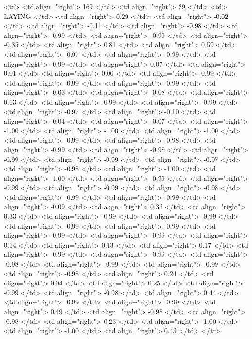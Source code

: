  <tr> <td align="right"> 169 </td> <td align="right">  29 </td> <td> LAYING </td> <td align="right"> 0.29 </td> <td align="right"> -0.02 </td> <td align="right"> -0.11 </td> <td align="right"> -0.98 </td> <td align="right"> -0.99 </td> <td align="right"> -0.99 </td> <td align="right"> -0.35 </td> <td align="right"> 0.81 </td> <td align="right"> 0.59 </td> <td align="right"> -0.97 </td> <td align="right"> -0.99 </td> <td align="right"> -0.99 </td> <td align="right"> 0.07 </td> <td align="right"> 0.01 </td> <td align="right"> 0.00 </td> <td align="right"> -0.99 </td> <td align="right"> -0.99 </td> <td align="right"> -0.99 </td> <td align="right"> -0.03 </td> <td align="right"> -0.08 </td> <td align="right"> 0.13 </td> <td align="right"> -0.99 </td> <td align="right"> -0.99 </td> <td align="right"> -0.97 </td> <td align="right"> -0.10 </td> <td align="right"> -0.04 </td> <td align="right"> -0.07 </td> <td align="right"> -1.00 </td> <td align="right"> -1.00 </td> <td align="right"> -1.00 </td> <td align="right"> -0.99 </td> <td align="right"> -0.98 </td> <td align="right"> -0.99 </td> <td align="right"> -0.98 </td> <td align="right"> -0.99 </td> <td align="right"> -0.99 </td> <td align="right"> -0.97 </td> <td align="right"> -0.98 </td> <td align="right"> -1.00 </td> <td align="right"> -1.00 </td> <td align="right"> -0.99 </td> <td align="right"> -0.99 </td> <td align="right"> -0.99 </td> <td align="right"> -0.98 </td> <td align="right"> -0.99 </td> <td align="right"> -0.99 </td> <td align="right"> -0.09 </td> <td align="right"> 0.33 </td> <td align="right"> 0.33 </td> <td align="right"> -0.99 </td> <td align="right"> -0.99 </td> <td align="right"> -0.99 </td> <td align="right"> -0.99 </td> <td align="right"> -0.99 </td> <td align="right"> -0.99 </td> <td align="right"> 0.14 </td> <td align="right"> 0.13 </td> <td align="right"> 0.17 </td> <td align="right"> -0.99 </td> <td align="right"> -0.99 </td> <td align="right"> -0.98 </td> <td align="right"> -0.99 </td> <td align="right"> -0.99 </td> <td align="right"> -0.98 </td> <td align="right"> 0.24 </td> <td align="right"> 0.04 </td> <td align="right"> 0.25 </td> <td align="right"> -0.99 </td> <td align="right"> -0.98 </td> <td align="right"> 0.44 </td> <td align="right"> -0.99 </td> <td align="right"> -0.99 </td> <td align="right"> 0.49 </td> <td align="right"> -0.98 </td> <td align="right"> -0.98 </td> <td align="right"> 0.23 </td> <td align="right"> -1.00 </td> <td align="right"> -1.00 </td> <td align="right"> 0.43 </td> </tr>
